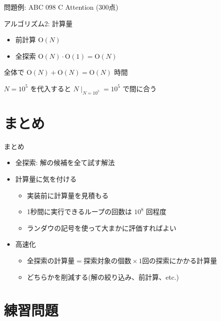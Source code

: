 \documentclass[dvipdfmx]{beamer}
\begin{document}
\begin{frame}{問題例: ABC 098 C Attention (300点)}
  \begin{block}{アルゴリズム2: 計算量}
    \begin{itemize}
      \item 前計算 $\mathrm{O}(N)$
      \item 全探索 $\mathrm{O}(N) \cdot \mathrm{O}(1) = \mathrm{O}(N)$
    \end{itemize}
    全体で $\mathrm{O}(N) + \mathrm{O}(N) = \mathrm{O}(N)$ 時間

    $N=10^5$ を代入すると $N \mid_{N=10^5} = 10^{5}$ で間に合う
  \end{block}
\end{frame}

\section{まとめ}

\begin{frame}{まとめ}
  \begin{itemize}
    \item 全探索: 解の候補を全て試す解法
    \item 計算量に気を付ける
    \begin{itemize}
      \item 実装前に計算量を見積もる
      \item 1秒間に実行できるループの回数は $10^8$ 回程度
      \item ランダウの記号を使って大まかに評価すればよい
    \end{itemize}
    \item 高速化
    \begin{itemize}
      \item $\text{全探索の計算量} = \text{探索対象の個数} \times \text{1回の探索にかかる計算量}$
      \item どちらかを削減する(解の絞り込み、前計算、etc.)
    \end{itemize}
  \end{itemize}
\end{frame}

\section{練習問題}
\end{document}
